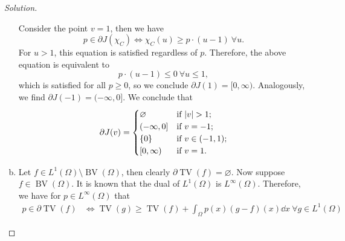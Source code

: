 \documentclass{article}
\theoremstyle{plain}
\theoremstyle{remark}
\newenvironment{solution}{\begin{proof}[Solution]\renewcommand\qedsymbol{}}{\end{proof}}
\renewcommand{\emptyset}{\varnothing}
\DeclareMathOperator\TV{TV}
\DeclareMathOperator\BV{BV}
\newcommand\pt\partial
\begin{document}
\begin{solution}
\begin{enumerate}[(a)]
Consider the point $v = 1$, then we have
\[
p \in \pt J(\chi_C) \iff \chi_C(u) \geq p \cdot (u - 1) \ \forall u.
\]
For $u > 1$, this equation is satisfied regardless of $p$. Therefore, the above equation is equivalent to
\[
p \cdot(u-1) \leq 0 \ \forall u \leq 1, 
\]
which is satisfied for all $p \geq 0$, so we conclude $\pt J(1) = [0, \infty)$. 
Analogously, we find $\pt J(-1) = (-\infty, 0]$. We conclude that
\[
\pt J(v) = \begin{cases}
	\emptyset &\text{if $\abs{v} > 1$}; \\
	(-\infty, 0] &\text{if $v = -1$}; \\
	\qty{0} &\text{if $v \in (-1, 1)$}; \\
	[0, \infty) &\text{if $v = 1$}. 
\end{cases}
\]

\item Let $f \in L^1(\Omega) \setminus \BV(\Omega)$, then clearly $\pt \TV(f) = \emptyset$. Now suppose $f \in \BV(\Omega)$.  It is known that the dual of $L^1(\Omega)$ is $L^\infty(\Omega)$. Therefore, we have for $p \in L^\infty(\Omega)$ that 
\begin{align*}
	p \in \pt \TV(f) &\iff \TV(g) \geq \TV(f) + \int_{\Omega} p(x) (g - f)(x) \dd{x} \ \forall g \in L^1(\Omega)
\end{align*}
\end{enumerate}
\end{solution}
\end{document}
